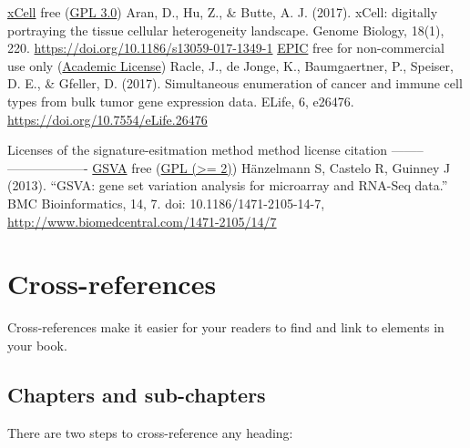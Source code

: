 \documentclass[
  12pt,
]{book}
\theoremstyle{definition}
\theoremstyle{definition}
\theoremstyle{definition}
\theoremstyle{definition}
\theoremstyle{remark}
\begin{document}
\textbar{} \href{http://xcell.ucsf.edu/}{xCell} \textbar{} free (\href{https://github.com/dviraran/xCell/blob/master/DESCRIPTION}{GPL 3.0}) \textbar{} Aran, D., Hu, Z., \& Butte, A. J. (2017). xCell: digitally portraying the tissue cellular heterogeneity landscape. Genome Biology, 18(1), 220. \url{https://doi.org/10.1186/s13059-017-1349-1} \textbar{}
\textbar{} \href{https://gfellerlab.shinyapps.io/EPIC_1-1/}{EPIC} \textbar{} free for non-commercial use only (\href{https://github.com/GfellerLab/EPIC/blob/master/LICENSE}{Academic License}) \textbar{} Racle, J., de Jonge, K., Baumgaertner, P., Speiser, D. E., \& Gfeller, D. (2017). Simultaneous enumeration of cancer and immune cell types from bulk tumor gene expression data. ELife, 6, e26476. \url{https://doi.org/10.7554/eLife.26476} \textbar{}

Licenses of the signature-esitmation method
\textbar{} method \textbar{} license \textbar{} citation \textbar{}
\textbar--------\textbar---------\textbar----------\textbar{}
\textbar{} \href{http://www.bioconductor.org/packages/release/bioc/html/GSVA.html}{GSVA} \textbar{} free (\href{https://github.com/rcastelo/GSVA}{GPL (\textgreater= 2)}) \textbar{} Hänzelmann S, Castelo R, Guinney J (2013). ``GSVA: gene set variation analysis for microarray and RNA-Seq data.'' BMC Bioinformatics, 14, 7. doi: 10.1186/1471-2105-14-7, \url{http://www.biomedcentral.com/1471-2105/14/7} \textbar{}

\hypertarget{cross}{%
\chapter{Cross-references}\label{cross}}

Cross-references make it easier for your readers to find and link to elements in your book.

\hypertarget{chapters-and-sub-chapters}{%
\section{Chapters and sub-chapters}\label{chapters-and-sub-chapters}}

There are two steps to cross-reference any heading:
\end{document}
